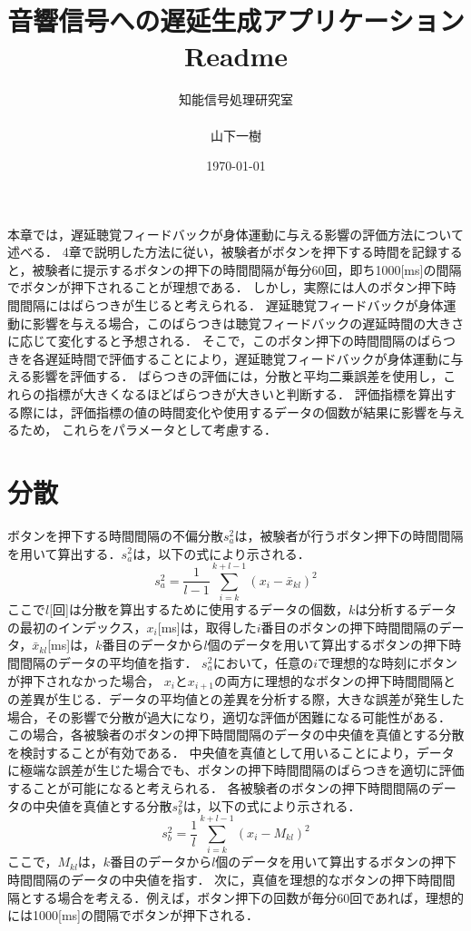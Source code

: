 \documentclass{article} %
\title{音響信号への遅延生成アプリケーション Readme} %
\author{知能信号処理研究室\\\\山下一樹} %
\date{\today} %
\begin{document}
本章では，遅延聴覚フィードバックが身体運動に与える影響の評価方法について述べる．
4章で説明した方法に従い，被験者がボタンを押下する時間を記録すると，被験者に提示するボタンの押下の時間間隔が毎分60回，即ち1000[ms]の間隔でボタンが押下されることが理想である．
しかし，実際には人のボタン押下時間間隔にはばらつきが生じると考えられる．
遅延聴覚フィードバックが身体運動に影響を与える場合，このばらつきは聴覚フィードバックの遅延時間の大きさに応じて変化すると予想される．
そこで，このボタン押下の時間間隔のばらつきを各遅延時間で評価することにより，遅延聴覚フィードバックが身体運動に与える影響を評価する．
ばらつきの評価には，分散と平均二乗誤差を使用し，これらの指標が大きくなるほどばらつきが大きいと判断する．
評価指標を算出する際には，評価指標の値の時間変化や使用するデータの個数が結果に影響を与えるため，
これらをパラメータとして考慮する．
\section{分散}
ボタンを押下する時間間隔の不偏分散$s^2_{a}$は，被験者が行うボタン押下の時間間隔を用いて算出する．$s^2_{a}$は，以下の式により示される．
\begin{equation}
  s^2_a = \frac{1}{l-1} \sum_{i=k}^{k+l-1} (x_i - \bar{x}_{kl})^2
\end{equation}
ここで$l$[回]は分散を算出するために使用するデータの個数，$k$は分析するデータの最初のインデックス，$x_{i}$[ms]は，取得した$i$番目のボタンの押下時間間隔のデータ，$\bar{x}_{kl}$[ms]は，$k$番目のデータから$l$個のデータを用いて算出するボタンの押下時間間隔のデータの平均値を指す．
$s^2_{a}$において，任意の$i$で理想的な時刻にボタンが押下されなかった場合，
$x_{i}$と$x_{i+1}$の両方に理想的なボタンの押下時間間隔との差異が生じる．データの平均値との差異を分析する際，大きな誤差が発生した場合，その影響で分散が過大になり，適切な評価が困難になる可能性がある．
この場合，各被験者のボタンの押下時間間隔のデータの中央値を真値とする分散を検討することが有効である．
中央値を真値として用いることにより，データに極端な誤差が生じた場合でも、ボタンの押下時間間隔のばらつきを適切に評価することが可能になると考えられる．
各被験者のボタンの押下時間間隔のデータの中央値を真値とする分散$s^2_{b}$は，以下の式により示される．
\begin{equation}
  s^2_b = \frac{1}{l} \sum_{i=k}^{k+l-1} (x_i - M_{kl})^2
\end{equation}
ここで，$M_{kl}$は，$k$番目のデータから$l$個のデータを用いて算出するボタンの押下時間間隔のデータの中央値を指す．
次に，真値を理想的なボタンの押下時間間隔とする場合を考える．例えば，ボタン押下の回数が毎分60回であれば，理想的には1000[ms]の間隔でボタンが押下される．
\end{document}

